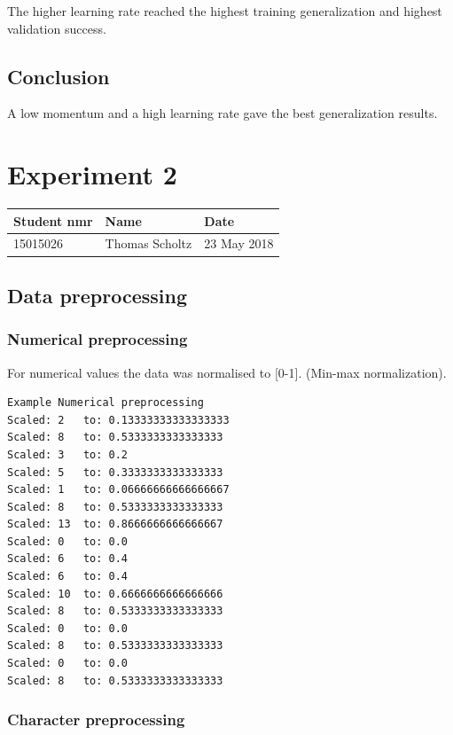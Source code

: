 \documentclass[11pt]{article}
\begin{document}
The higher learning rate reached the highest training generalization and
highest validation success.

\hypertarget{conclusion}{%
\subsection{Conclusion}\label{conclusion}}

A low momentum and a high learning rate gave the best generalization
results.

    \hypertarget{experiment-2}{%
\section{Experiment 2}\label{experiment-2}}

\begin{longtable}[]{@{}lll@{}}
\toprule
Student nmr & Name & Date\tabularnewline
\midrule
\endhead
15015026 & Thomas Scholtz & 23 May 2018\tabularnewline
\bottomrule
\end{longtable}

    \hypertarget{data-preprocessing}{%
\subsection{Data preprocessing}\label{data-preprocessing}}

\hypertarget{numerical-preprocessing}{%
\subsubsection{Numerical preprocessing}\label{numerical-preprocessing}}

For numerical values the data was normalised to {[}0-1{]}. (Min-max
normalization).

\begin{verbatim}
Example Numerical preprocessing
Scaled: 2   to: 0.13333333333333333
Scaled: 8   to: 0.5333333333333333
Scaled: 3   to: 0.2
Scaled: 5   to: 0.3333333333333333
Scaled: 1   to: 0.06666666666666667
Scaled: 8   to: 0.5333333333333333
Scaled: 13  to: 0.8666666666666667
Scaled: 0   to: 0.0
Scaled: 6   to: 0.4
Scaled: 6   to: 0.4
Scaled: 10  to: 0.6666666666666666
Scaled: 8   to: 0.5333333333333333
Scaled: 0   to: 0.0
Scaled: 8   to: 0.5333333333333333
Scaled: 0   to: 0.0
Scaled: 8   to: 0.5333333333333333
\end{verbatim}

\hypertarget{character-preprocessing}{%
\subsubsection{Character preprocessing}\label{character-preprocessing}}
\end{document}
